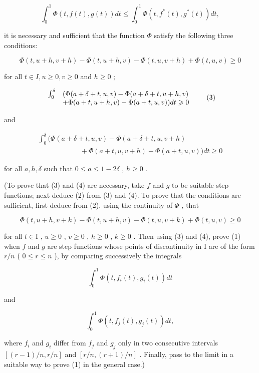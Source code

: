 \[
\int_ {0} ^ {1} \Phi (t, f (t), g (t)) d t \leqslant \int_ {0} ^ {1} \Phi (t, f ^ {*} (t), g ^ {*} (t)) d t,\tag{1}
\]

it is necessary and sufficient that the function \(\Phi\) satisfy the following three conditions:

\[
\Phi (t, u + h, v + h) - \Phi (t, u + h, v) - \Phi (t, u, v + h) + \Phi (t, u, v) \geqslant 0\tag{2}
\]

for all \(t \in I, u \geqslant 0, v \geqslant 0\) and \(h \geqslant 0\) ;

\[
\begin{array}{r l} \int_ {0} ^ {\delta} & (\Phi (a + \delta + t, u, v) - \Phi (a + \delta + t, u + h, v) \\ & + \Phi (a + t, u + h, v) - \Phi (a + t, u, v)) d t \geqslant 0 \end{array}\tag{3}
\]

and

\[
\begin{array}{l} \int_ {0} ^ {\delta} \big (\Phi (a + \delta + t, u, v) - \Phi (a + \delta + t, u, v + h) \\ \qquad \qquad \qquad + \Phi (a + t, u, v + h) - \Phi (a + t, u, v) \big) d t \geqslant 0 \end{array}\tag{4}
\]

for all \(a, h, \delta\) such that \(0 \leqslant a \leqslant 1 - 2\delta\) , \(h \geqslant 0\) .

(To prove that (3) and (4) are necessary, take \(f\) and \(g\) to be suitable step functions; next deduce (2) from (3) and (4). To prove that the conditions are sufficient, first deduce from (2), using the continuity of \(\Phi\) , that

\[
\Phi (t, u + h, v + k) - \Phi (t, u + h, v) - \Phi (t, u, v + k) + \Phi (t, u, v) \geqslant 0\tag{5}
\]

for all \(t \in \mathrm{I}\) , \(u \geqslant 0\) , \(v \geqslant 0\) , \(h \geqslant 0\) , \(k \geqslant 0\) . Then using (3) and (4), prove (1) when \(f\) and \(g\) are step functions whose points of discontinuity in \(\mathrm{I}\) are of the form \(r / n\) ( \(0 \leqslant r \leqslant n\) ), by comparing successively the integrals

\[
\int_ {0} ^ {1} \Phi (t, f _ {i} (t), g _ {i} (t)) d t
\]

and

\[
\int_ {0} ^ {1} \Phi (t, f _ {j} (t), g _ {j} (t)) d t,
\]

where \(f_{i}\) and \(g_{i}\) differ from \(f_{j}\) and \(g_{j}\) only in two consecutive intervals \([(r - 1) / n, r / n]\) and \([r / n, (r + 1) / n]\) . Finally, pass to the limit in a suitable way to prove (1) in the general case.)

